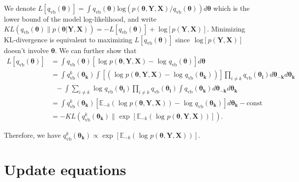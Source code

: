 \documentclass[
]{book}
\begin{document}
We denote \(L[q_{\text{vb}}(\boldsymbol{\theta})] = \int q_{\text{vb}}(\boldsymbol{\theta}) \text{log} \left ( p(\boldsymbol{\theta,Y,X}) / q_{\text{vb}}(\boldsymbol{\theta}) \right)d\boldsymbol{\theta}\) which is the lower bound of the model log-likelihood, and write \(KL(q_{\text{vb}}(\boldsymbol{\theta})\|p(\boldsymbol{\theta|Y,X})) = -L[q_{\text{vb}}(\boldsymbol{\theta})] + \text{ log} \left[ p(\boldsymbol{Y,X}) \right]\). Minimizing KL-divergence is equivalent to maximizing \(L[q_{\text{vb}}(\boldsymbol{\theta})]\) since \(\text{ log} \left[ p(\boldsymbol{Y,X}) \right]\) doesn't involve \(\boldsymbol{\theta}\). We can further show that
\begin{align}\label{eq:lowerbound}
L[q_{\text{vb}}(\boldsymbol{\theta})] &= \int q_{\text{vb}}(\boldsymbol{\theta}) \left[ \text{ log }p(\boldsymbol{\theta,Y,X}) - \text{ log } q_{\text{vb}}(\boldsymbol{\theta}) \right] d\boldsymbol{\theta} \nonumber \\
& = \int q^{k}_{\text{vb}}(\boldsymbol{\theta_k})
\int \left[
\left(\text{ log }p(\boldsymbol{\theta,Y,X}) - \text{ log }q_{\text{vb}}(\boldsymbol{\theta_k})
\right) \right] \prod_{i \neq k} q_{\text{vb}}(\boldsymbol{\theta_i}) d\boldsymbol{\theta_{-k}}d\boldsymbol{\theta_k}  
\nonumber \\
& \text{  } -\int \sum_{i \neq k} \text{ log }q_{\text{vb}}(\boldsymbol{\theta_i}) \prod_{i \neq k} q_{\text{vb}}(\boldsymbol{\theta_i}) \int q_{\text{vb}}(\boldsymbol{\theta_k}) d\boldsymbol{\theta_{-k}}d\boldsymbol{\theta_k} 
\nonumber \\
&= \int q^{k}_{\text{vb}}(\boldsymbol{\theta_k})
\left[\mathbb{E}_{-k} (\text{ log }p(\boldsymbol{\theta,Y,X})) - 
\text{ log } q_{\text{vb}}(\boldsymbol{\theta_k})\right]
d\boldsymbol{\theta_k} - \text{const}  \nonumber \\
&=-KL(q^{k}_{\text{vb}}(\boldsymbol{\theta_k}) \| \text{ exp } \left[
\mathbb{E}_{-k} (\text{ log }p(\boldsymbol{\theta,Y,X}))
\right]).
\end{align}

Therefore, we have \(q^{k}_{\text{vb}}(\boldsymbol{\theta_k}) \propto \text{ exp } \left[ \mathbb{E}_{-k} (\text{ log }p(\boldsymbol{\theta,Y,X})) \right]\).

\hypertarget{derivation}{%
\section{Update equations}\label{derivation}}
\end{document}
